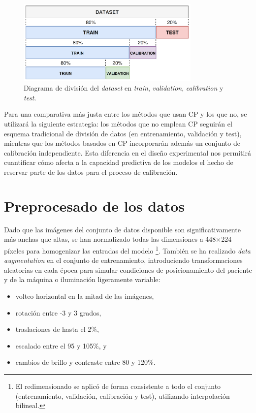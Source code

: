 \begin{figure}[htbp]
    \centering
    \includegraphics[width=0.8\textwidth]{capitulos/cap_04/imagenes/data_split_conformal.png}
    \caption[
        Diagrama de división del \textit{dataset} en \textit{train}, \textit{validation}, \textit{calibration} y \textit{test}.
    ]{
        Diagrama de división del \textit{dataset} en \textit{train}, \textit{validation}, \textit{calibration} y \textit{test}. 
    } 
    \label{fig:data_split_conformal}
\end{figure}

Para una comparativa más justa entre los métodos que usan \acrshort{CP} y los que no, se utilizará la siguiente estrategia: los métodos que no emplean \acrshort{CP} seguirán el esquema tradicional de división de datos (en entrenamiento, validación y test), mientras que los métodos basados en \acrshort{CP} incorporarán además un conjunto de calibración independiente. Esta diferencia en el diseño experimental nos permitirá cuantificar cómo afecta a la capacidad predictiva de los modelos el hecho de reservar parte de los datos para el proceso de calibración.


\section{Preprocesado de los datos}

Dado que las imágenes del conjunto de datos disponible son significativamente más anchas que altas, se han normalizado todas las dimensiones a 448×224 píxeles para homogenizar las entradas del modelo%
\footnote{
    El redimensionado se aplicó de forma consistente a todo el conjunto (entrenamiento, validación, calibración y test), utilizando interpolación bilineal.
}.
También se ha realizado \textit{data augmentation} en el conjunto de entrenamiento, introduciendo
transformaciones aleatorias en cada época para simular condiciones de posicionamiento del paciente y de la 
máquina o iluminación ligeramente variable:
\begin{itemize}
    \item volteo horizontal en la mitad de las imágenes,
    \item rotación entre -3 y 3 grados,
    \item traslaciones de hasta el 2\%,
    \item escalado entre el 95 y 105\%, y
    \item cambios de brillo y contraste entre 80 y 120\%. 
\end{itemize}

